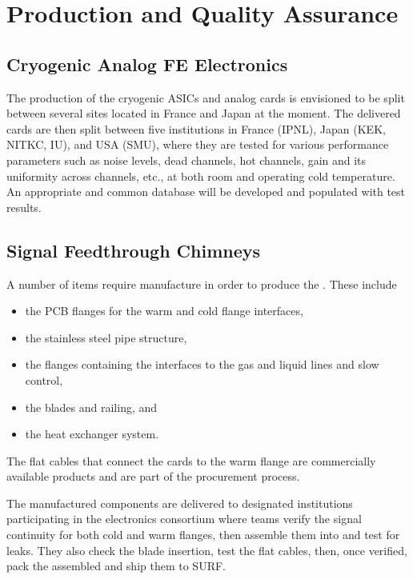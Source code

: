 \section{Production and Quality Assurance}
\label{sec:fddp-tpc-elec-prod-assy}

\subsection{Cryogenic Analog FE Electronics}
\label{sec:fddp-tpc-elec-prod-fe}
The production of the cryogenic ASICs and analog  cards is envisioned to be split between several sites located in France and Japan at the moment. The delivered cards are then split between five institutions in France (IPNL), Japan (KEK, NITKC, IU), and USA (SMU), where they are tested for various performance parameters such as noise levels, dead channels, hot channels, gain and its uniformity across channels, etc., at both room and operating cold temperature. An appropriate and common database will be developed and populated with test results. 

\subsection{Signal Feedthrough Chimneys}
\label{sec:fddp-tpc-elec-prod-sft}
A number of items require manufacture in order to produce the . These include 
\begin{itemize}
\item the PCB flanges for the warm and cold \fdth flange interfaces, 
\item the stainless steel pipe structure, 
\item the flanges containing the interfaces to the gas and liquid lines and slow control, 
\item the blades and railing, and 
\item the heat exchanger system. 
\end{itemize}
The flat cables that connect the  cards to the warm flange are commercially available products and are part of the  procurement process. 

The %
manufactured components are delivered to %
designated institutions participating in the \dual electronics consortium where teams verify the signal continuity %
for both cold and warm flanges, then assemble them into  and test for leaks. %
They also check the blade insertion, %
 test the flat cables,  %
 then, once verified, pack the assembled  %
 and ship them to SURF. 

